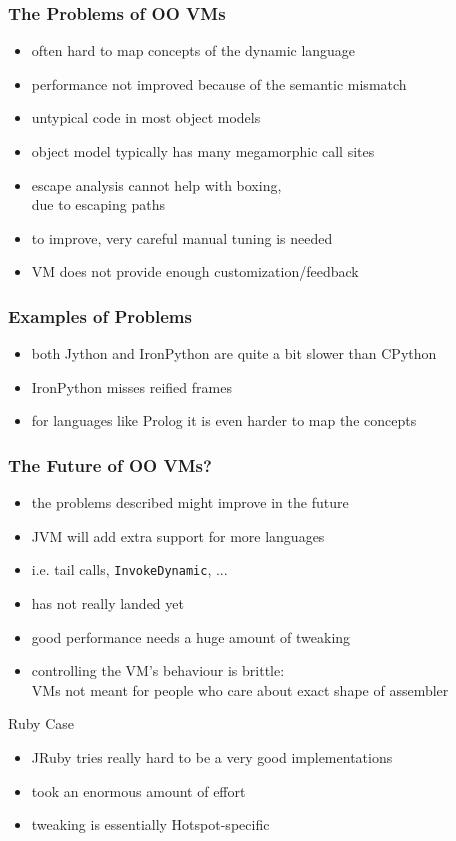\documentclass[utf8x]{beamer}
\begin{document}
\begin{frame}
  \frametitle{The Problems of OO VMs}
  \begin{itemize}
      \item often hard to map concepts of the dynamic language
      \item performance not improved because of the semantic mismatch
      \item untypical code in most object models
      \item object model typically has many megamorphic call sites
      \pause
      \item escape analysis cannot help with boxing,\\
      due to escaping paths
      \item to improve, very careful manual tuning is needed
      \item VM does not provide enough customization/feedback
  \end{itemize}
\end{frame}

\begin{frame}
  \frametitle{Examples of Problems}
  \begin{itemize}
      \item both Jython and IronPython are quite a bit slower than CPython
      \item IronPython misses reified frames
      \pause
      \item for languages like Prolog it is even harder to map the concepts
  \end{itemize}
\end{frame}

 
\begin{frame}
  \frametitle{The Future of OO VMs?}
  \begin{itemize}
  \item the problems described might improve in the future
  \item JVM will add extra support for more languages
  \item i.e. tail calls, \texttt{InvokeDynamic}, ...
  \item has not really landed yet
  \item good performance needs a huge amount of tweaking
  \item controlling the VM's behaviour is brittle:\\
  VMs not meant for people who care about exact shape of assembler
  \end{itemize}
  \pause
  \begin{block}{Ruby Case}
    \begin{itemize}
    \item JRuby tries really hard to be a very good implementations
    \item took an enormous amount of effort
    \item tweaking is essentially Hotspot-specific
    \end{itemize}
  \end{block}
\end{frame}
\end{document}
